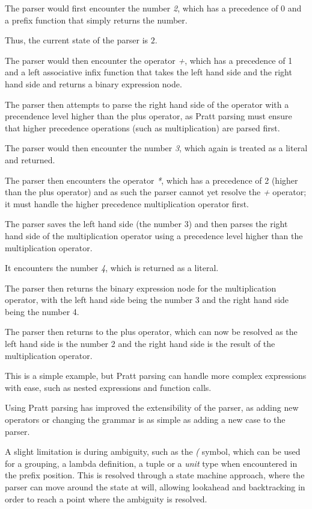 The parser would first encounter the number \textit{2}, which has a precedence of 0 and a prefix function that
simply returns the number.

Thus, the current state of the parser is $2$.

The parser would then encounter the operator \textit{+}, which has a precedence of 1 and a left associative infix
function that takes the left hand side and the right hand side and returns a binary expression node.

The parser then attempts to parse the right hand side of the operator with a precendence level higher than the
plus operator, as Pratt parsing must ensure that higher precedence operations (such as multiplication) are parsed
first.

The parser would then encounter the number \textit{3}, which again is treated as a literal and returned.

The parser then encounters the operator \textit{*}, which has a precedence of 2 (higher than the plus operator) and 
as such the parser cannot yet resolve the \textit{+} operator; it must handle the higher precedence multiplication
operator first.

The parser saves the left hand side (the number 3) and then parses the right hand side of the multiplication 
operator using a precedence level higher than the multiplication operator.

It encounters the number \textit{4}, which is returned as a literal.

The parser then returns the binary expression node for the multiplication operator, with the left hand side being
the number 3 and the right hand side being the number 4.

The parser then returns to the plus operator, which can now be resolved as the left hand side is the number 2 and the
right hand side is the result of the multiplication operator.

This is a simple example, but Pratt parsing can handle more complex expressions with ease, such as nested
expressions and function calls.

Using Pratt parsing has improved the extensibility of the parser, as adding new operators or changing the grammar
is as simple as adding a new case to the parser.

A slight limitation is during ambiguity, such as the \textit{(} symbol, which can be used for a grouping, a lambda 
definition, a tuple or a \textit{unit} type when encountered in the prefix position.
This is resolved through a state machine approach, where the parser can move around the state at will, allowing 
lookahead and backtracking in order to reach a point where the ambiguity is resolved.

